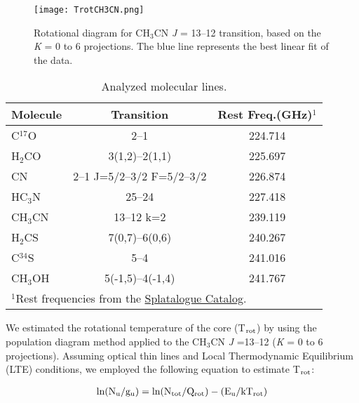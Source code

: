 \documentclass[baaa]{baaa}
\begin{document}
\begin{figure}[h!]
    \centering
    \texttt{[image: TrotCH3CN.png]}
    \caption{Rotational diagram for CH$_{3}$CN \textit{J} = 13--12 transition, based on the \textit{K} = 0 to 6 projections. The blue line represents the best linear fit of the data.}
    \label{trot}
\end{figure}



\begin{table}
\caption{Analyzed molecular lines.}
\centering
\tiny
\begin{tabular}{lcc}
\hline\hline\noalign{\smallskip}
Molecule    & Transition &  Rest Freq.(GHz)$^{1}$        \\
\hline\noalign{\smallskip}
C$^{17}$O   & 2--1            & 224.714               \\             
H$_{2}$CO   & 3(1,2)--2(1,1)            & 225.697               \\             
CN   & 2--1 J=5/2--3/2 F=5/2--3/2       & 226.874               \\             
HC$_{3}$N   & 25--24            & 227.418               \\             
CH$_{3}$CN           & 13--12 k=2 & 239.119           \\
H$_{2}$CS           & 7(0,7)--6(0,6) & 240.267           \\
C$^{34}$S           & 5--4 & 241.016           \\
CH$_{3}$OH                & 5(-1,5)--4(-1,4)         & 241.767                    \\
\hline

\multicolumn{3}{l}{$^{1}$Rest frequencies from the \href{https://splatalogue.online}{Splatalogue Catalog}.}\\
\end{tabular}
\label{table}
\end{table}

We estimated the rotational temperature of the core (T$\rm_{rot}$) by using the population diagram method \citep{goldsmith99} applied to the CH$_{3}$CN \textit{J} =13--12 (\textit{K} = 0 to 6 projections). Assuming optical thin lines and Local Thermodynamic Equilibrium (LTE) conditions, we employed the following equation to estimate T$\rm_{rot}$:

\begin{align}
{\rm ln(N_u/g_u}) = {\rm ln(N_{tot}/Q_{rot})-(E_u/kT_{rot})}
     \label{RotDia}    
\end{align}
\end{document}
